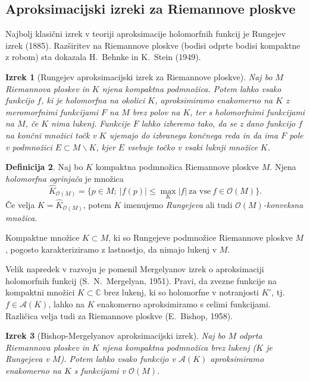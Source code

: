 \documentclass[12pt,a4paper,twoside]{article}
\theoremstyle{definition} %
\newtheorem{definicija}{Definicija}[section]
\theoremstyle{plain} %
\newtheorem{izrek}[definicija]{Izrek}
\numberwithin{equation}{section}  %
\newcommand{\C}{\mathbb C}
\begin{document}
\subsection{Aproksimacijski izreki za Riemannove ploskve}
%
Najbolj klasični izrek v teoriji aproksimacije holomorfnih funkcij je Rungejev izrek (1885). Razširitev na Riemannove ploskve (bodisi odprte bodisi kompaktne z robom) sta dokazala H.~Behnke in K.~Stein (1949).

\begin{izrek} [Rungejev aproksimacijski izrek za Riemannove ploskve] \label{izr:Runge}
Naj bo $M$ Riemannova ploskev in $K$ njena kompaktna podmnožica. 
Potem lahko vsako funkcijo $f$, ki je holomorfna na okolici $K$, aproksimiramo enakomerno na $K$ z meromorfnimi funkcijami $F$ na $M$ brez polov na $K$, ter s holomorfnimi funkcijami na $M$, če $K$ nima lukenj.
Funkcije $F$ lahko izberemo tako, da se z dano funkcijo $f$ na končni množici točk v $K$ ujemajo do izbranega končnega reda in da ima $F$ pole v podmnožici $E \subset M \backslash K$, kjer $E$ vsebuje točko v vsaki luknji množice $K$. 
\end{izrek}

\begin{definicija}
Naj bo $K$ kompaktna podmnožica Riemannove ploskve $M$. Njena \emph{holomorfna ogrinjača} je množica 
\begin{equation}
\widehat{K}_{\mathcal{O}(M)} = \{p \in M ; \ |f(p)| \leq \max_{K} |f| \ \text{za vse} \ f \in \mathcal{O}(M) \}.
\end{equation}
Če velja $K = \widehat{K}_{\mathcal{O}(M)}$, potem $K$ imenujemo \emph{Rungejeva} ali tudi \emph{$\mathcal{O}(M)$-konveksna množica}.
\end{definicija}

Kompaktne množice $K \subset M$, ki so Rungejeve podmnožice Riemannove ploskve $M$, pogosto karakteriziramo z lastnostjo, da nimajo lukenj v $M$. \newline

Velik napredek v razvoju je pomenil Mergelyanov izrek o aproksimaciji holomorfnih funkcij (S.~N.~Mergelyan, 1951). Pravi, da zvezne funkcije na kompaktni množici $K \subset \C$ brez lukenj, ki so holomorfne v notranjosti $K^{\circ}$, tj.~$f \in \mathcal{A}(K)$, lahko na $K$ enakomerno aproksimiramo s celimi funkcijami.
Različica velja tudi za Riemannove ploskve (E.~Bishop, 1958).

\begin{izrek} [Bishop-Mergelyanov aproksimacijski izrek] \label{izr:Bishop-Mergelyan}
Naj bo $M$ odprta Riemannova ploskev in $K$ njena kompaktna podmnožica brez lukenj ($K$ je Rungejeva v $M$). Potem lahko vsako funkcijo v $\mathcal{A}(K)$ aproksimiramo enakomerno na $K$ s funkcijami v $\mathcal{O}(M)$.
\end{izrek}
\end{document}
